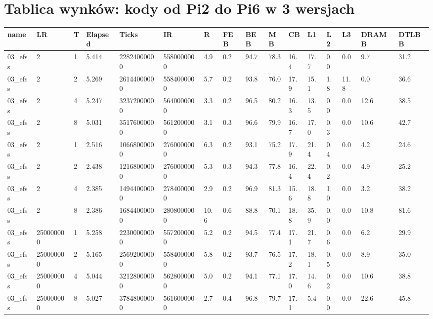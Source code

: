 \documentclass[12pt]{article}
\begin{document}
\section{Tablica wynków: kody od Pi2 do Pi6 w 3 wersjach}
\begin{flushleft}
\begin{landscape}
	\begin{tabular}{| l | l | l | l | l | l | l | l | l | l | l | l | l | l | l | l |}
		\hline
		name & LR & T & Elapsed & Ticks & IR & R & FEB & BEB & MB & CB & L1 & L2 & L3 & DRAMB & DTLBB \\ \hline
		03\_efss & 2 & 1 & 5.414 & 22824000000 & 5580000000 & 4.9 & 0.2 & 94.7 & 78.3 & 16.4 & 17.7 & 0.0 & 0.0 & 9.7 & 31.2 \\ \hline
		03\_efss & 2 & 2 & 5.269 & 26144000000 & 5584000000 & 5.7 & 0.2 & 93.8 & 76.0 & 17.9 & 15.1 & 1.8 & 11.8 & 0.0 & 36.6 \\ \hline
		03\_efss & 2 & 4 & 5.247 & 32372000000 & 5640000000 & 3.3 & 0.2 & 96.5 & 80.2 & 16.3 & 13.5 & 0.0 & 0.0 & 12.6 & 38.5 \\ \hline
		03\_efss & 2 & 8 & 5.031 & 35176000000 & 5612000000 & 3.1 & 0.3 & 96.6 & 79.9 & 16.7 & 17.0 & 0.3 & 0.0 & 10.6 & 42.7 \\ \hline
		03\_efss & 2 & 1 & 2.516 & 10668000000 & 2760000000 & 6.3 & 0.2 & 93.1 & 75.2 & 17.9 & 21.4 & 0.4 & 0.0 & 4.2 & 24.6 \\ \hline
		03\_efss & 2 & 2 & 2.438 & 12168000000 & 2760000000 & 5.3 & 0.3 & 94.3 & 77.8 & 16.4 & 22.4 & 0.2 & 0.0 & 4.9 & 25.2 \\ \hline
		03\_efss & 2 & 4 & 2.385 & 14944000000 & 2784000000 & 2.9 & 0.2 & 96.9 & 81.3 & 15.6 & 18.8 & 1.0 & 0.0 & 3.2 & 38.2 \\ \hline
		03\_efss & 2 & 8 & 2.386 & 16844000000 & 2808000000 & 10.6 & 0.6 & 88.8 & 70.1 & 18.8 & 35.9 & 0.0 & 0.0 & 10.8 & 81.6 \\ \hline
		03\_efss & 250000000 & 1 & 5.258 & 22300000000 & 5572000000 & 5.2 & 0.2 & 94.5 & 77.4 & 17.1 & 21.7 & 0.6 & 0.0 & 6.2 & 29.9 \\ \hline
		03\_efss & 250000000 & 2 & 5.165 & 25692000000 & 5584000000 & 5.8 & 0.2 & 93.7 & 76.5 & 17.2 & 18.1 & 0.5 & 0.0 & 8.9 & 35.0 \\ \hline
		03\_efss & 250000000 & 4 & 5.044 & 32128000000 & 5628000000 & 5.0 & 0.2 & 94.1 & 77.1 & 17.0 & 14.6 & 0.2 & 0.0 & 10.6 & 38.8 \\ \hline
		03\_efss & 250000000 & 8 & 5.027 & 37848000000 & 5616000000 & 2.7 & 0.4 & 96.8 & 79.7 & 17.1 & 5.4 & 0.0 & 0.0 & 22.6 & 45.8 \\ \hline

\end{tabular}
\end{landscape}
\end{flushleft}
\end{document}
